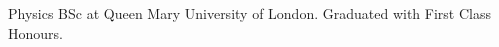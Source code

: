 %
%
%


\begin{scholarship}
            {Physics BSc at Queen Mary University of London. Graduated with First Class Honours.}
\end{scholarship}
